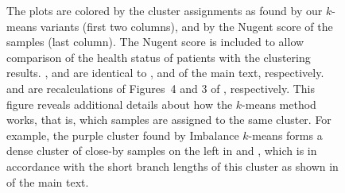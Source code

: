 \begin{figure}[hpbt]
{        The plots are colored by the cluster assignments as found by our $k$-means variants (first two columns),
        and by the Nugent score of the samples (last column).
        The Nugent score is included to allow comparison of the health status of patients with the clustering results.
        ,  and 
        are identical to ,
         and  of the main text, respectively.
         and  are recalculations of
        Figures~4 and 3 of \cite{Matsen2011b}, respectively.
        This figure reveals additional details about how the $k$-means method works,
        that is, which samples are assigned to the same cluster.
        For example, the purple cluster found by Imbalance $k$-means forms a dense cluster of close-by samples on the left
        in  and ,
        which is in accordance with the short branch lengths
        of this cluster as shown in  of the main text.
    }
    \label{fig:kmeans_all}
\end{figure}


